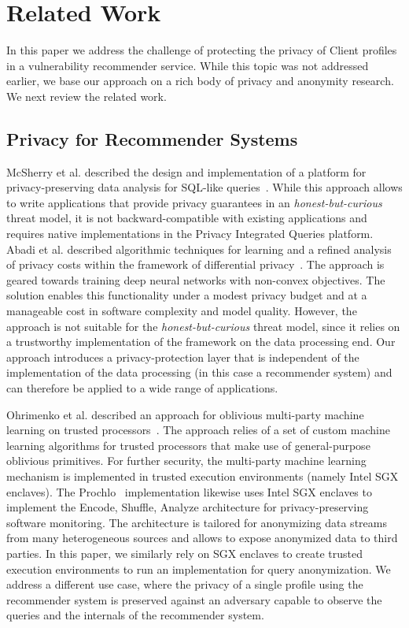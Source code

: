 {\section{Related Work}
\label{sec:related}
In this paper we address the challenge of protecting the privacy of Client profiles in a vulnerability recommender service.
While this topic was not addressed earlier, we base our approach on a rich body of privacy and anonymity research.
We next review the related work.

\subsection{Privacy for Recommender Systems}
\label{subsec:related-privacy}

McSherry et al. described the design and implementation of a platform for privacy-preserving data analysis for SQL-like queries~\cite{mcsherry:2009}.
While this approach allows to write applications that provide privacy guarantees in an \textit{honest-but-curious} threat model, it is not backward-compatible with existing applications and requires native implementations in the Privacy Integrated Queries platform. Abadi et al. described algorithmic techniques for learning and a refined analysis of privacy costs within the framework of differential privacy~\cite{abadi:2016}.
The approach is geared towards training deep neural networks with non-convex objectives.
The solution enables this functionality under a modest privacy budget and at a manageable cost in software complexity and model quality.
However, the approach is not suitable for the \textit{honest-but-curious} threat model, since it relies on a trustworthy implementation of the framework on the data processing end.
Our approach introduces a privacy-protection layer that is independent of the implementation of the data processing (in this case a recommender system) and can therefore be applied to a wide range of applications.

Ohrimenko et al. described an approach for oblivious multi-party machine learning on trusted processors~\cite{ohrimenko:2016}.
The approach relies of a set of custom machine learning algorithms for trusted processors that make use of general-purpose oblivious primitives.
For further security, the multi-party machine learning mechanism is implemented in trusted execution environments (namely Intel SGX enclaves).
The Prochlo~\cite{bittau:2017} implementation likewise uses Intel SGX enclaves to implement the Encode, Shuffle, Analyze architecture for privacy-preserving software monitoring.
The architecture is tailored for anonymizing data streams from many heterogeneous sources and allows to expose anonymized data to third parties.
In this paper, we similarly rely on SGX enclaves to create trusted execution environments to run an implementation for query anonymization.
We address a different use case, where the privacy of a single profile using the recommender system is preserved against an adversary capable to observe the queries and the internals of the recommender system.

}

